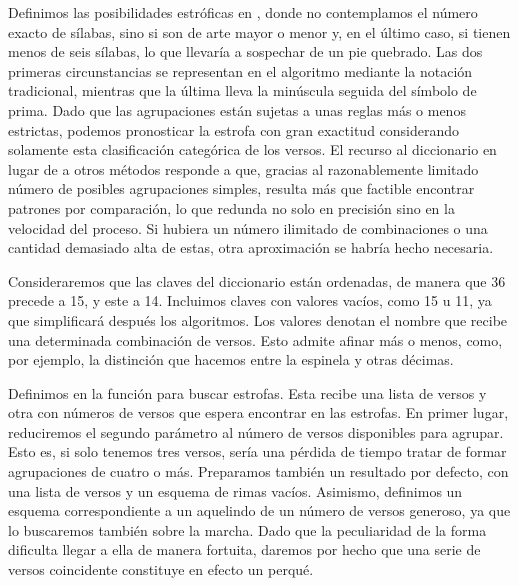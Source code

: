 Definimos las posibilidades estróficas en , donde no contemplamos el número exacto de sílabas, sino si son de arte mayor o menor y, en el último caso, si tienen menos de seis sílabas, lo que llevaría a sospechar de un pie quebrado. Las dos primeras circunstancias se representan en el algoritmo mediante la notación tradicional, mientras que la última lleva la minúscula seguida del símbolo de prima. Dado que las agrupaciones están sujetas a unas reglas más o menos estrictas, podemos pronosticar la estrofa con gran exactitud considerando solamente esta clasificación categórica de los versos. El recurso al diccionario en lugar de a otros métodos responde a que, gracias al razonablemente limitado número de posibles agrupaciones simples, resulta más que factible encontrar patrones por comparación, lo que redunda no solo en precisión sino en la velocidad del proceso. Si hubiera un número ilimitado de combinaciones o una cantidad demasiado alta de estas, otra aproximación se habría hecho necesaria.

Consideraremos que las claves del diccionario están ordenadas, de manera que 36 precede a 15, y este a 14. Incluimos claves con valores vacíos, como 15 u 11, ya que simplificará después los algoritmos. Los valores denotan el nombre que recibe una determinada combinación de versos. Esto admite afinar más o menos, como, por ejemplo, la distinción que hacemos entre la espinela y otras décimas.

Definimos en  la función para buscar estrofas. Esta recibe una lista de versos y otra con números de versos que espera encontrar en las estrofas. En primer lugar, reduciremos el segundo parámetro al número de versos disponibles para agrupar. Esto es, si solo tenemos tres versos, sería una pérdida de tiempo tratar de formar  agrupaciones de cuatro o más. Preparamos también un resultado por defecto, con una lista de versos y un esquema de rimas vacíos. Asimismo, definimos un esquema correspondiente a un aquelindo de un número de versos generoso, ya que lo buscaremos también sobre la marcha. Dado que la peculiaridad de la forma dificulta llegar a ella de manera fortuita, daremos por hecho que una serie de versos coincidente constituye en efecto un perqué.

